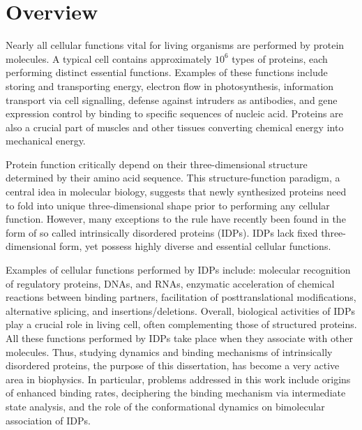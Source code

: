 \documentclass[../talant.diss.submit.tex]{subfiles}
\begin{document}
\label{chap:chapter1}
\section{\textbf{Overview}}\label{sect:one_one}

Nearly all cellular functions vital for living organisms are performed by
protein molecules. A typical cell contains approximately $10^6$ types of
proteins, each performing distinct essential functions. Examples of these
functions include storing and transporting energy, electron flow in
photosynthesis, information transport via cell signalling, defense against
intruders as antibodies, and gene expression control by binding to specific
sequences of nucleic acid. Proteins are also a crucial part of muscles and other
tissues converting chemical energy into mechanical energy.

Protein function critically depend on their three-dimensional structure determined by their
amino acid sequence. This structure-function paradigm, a central idea in molecular biology,
suggests that 
newly synthesized proteins need to fold into unique three-dimensional shape
prior to performing any cellular function. However, many exceptions to the rule
have recently been found in the form of so called intrinsically disordered
proteins (IDPs). IDPs lack fixed three-dimensional form, yet possess
highly diverse and essential cellular functions.\cite{dunker:01int}

Examples of cellular functions performed by IDPs include: molecular recognition
of regulatory proteins, DNAs, and RNAs, enzymatic acceleration of chemical
reactions between binding partners, facilitation of posttranslational
modifications, alternative splicing, and insertions/deletions.  Overall,
biological activities of IDPs play a crucial role in living cell, often
complementing those of structured proteins. All these functions performed by
IDPs take place when they associate with other molecules.  Thus, studying
dynamics and binding mechanisms of intrinsically disordered proteins, the
purpose of this dissertation, has become a very active area in biophysics.
In particular, problems addressed in this work include origins of enhanced binding
rates, deciphering the binding mechanism via intermediate state analysis,
and the role of the conformational dynamics on bimolecular association of IDPs.
\end{document}

